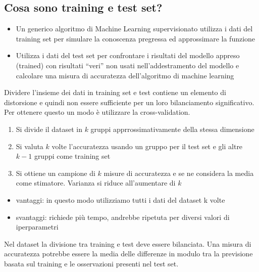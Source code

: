 \documentclass[12pt]{article}
\begin{document}
\subsection{Cosa sono training e test set?}
\begin{itemize}
    \item Un generico algoritmo di Machine Learning supervisionato utilizza i dati del training set per simulare la conoscenza pregressa ed approssimare la funzione
    \item Utilizza i dati del test set per confrontare i risultati del modello appreso (trained) con risultati “veri” non usati nell’addestramento del modello e calcolare una misura di accuratezza dell’algoritmo di machine learning
\end{itemize}
Dividere l’insieme dei dati in training set e test contiene un elemento di distorsione e quindi non essere sufficiente per
un loro bilanciamento significativo. Per ottenere questo un modo è utilizzare la cross-validation.
\begin{enumerate}
    \item Si divide il dataset in $k$ gruppi apprrossimativamente della stessa dimensione
    \item Si valuta $k$ volte l’accuratezza usando un gruppo per il test set e gli altre $k-1$ gruppi come training set
    \item Si ottiene un campione di $k$ misure di accuratezza e se ne considera la media come stimatore. Varianza si riduce all’aumentare di $k$
\end{enumerate}
\begin{itemize}
    \item vantaggi: in questo modo utilizziamo tutti i dati del dataset k volte
    \item svantaggi: richiede più tempo, andrebbe ripetuta per diversi valori di iperparametri
\end{itemize}
Nel dataset la divisione tra training e test deve essere bilanciata.
Una misura di accuratezza potrebbe essere la media delle differenze in modulo tra la previsione basata sul training e le osservazioni presenti nel test set.
\newpage
\end{document}
